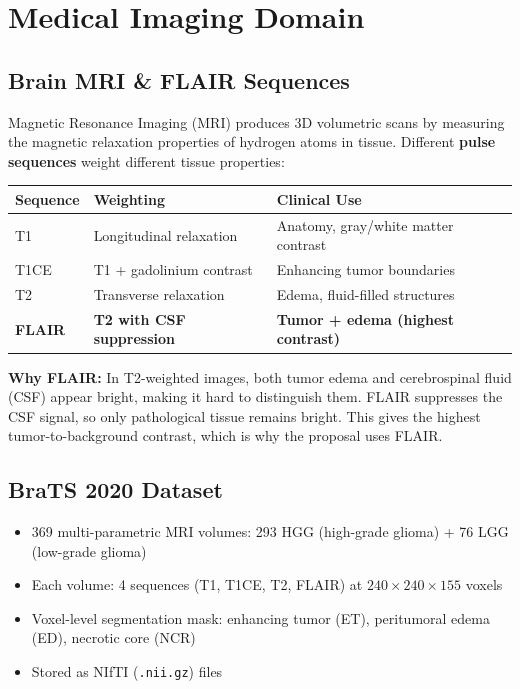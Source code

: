 \documentclass[11pt,a4paper]{article}
\theoremstyle{definition}
\begin{document}
\section{Medical Imaging Domain}

\subsection{Brain MRI \& FLAIR Sequences}

Magnetic Resonance Imaging (MRI) produces 3D volumetric scans by measuring the magnetic relaxation properties of hydrogen atoms in tissue. Different \textbf{pulse sequences} weight different tissue properties:

\begin{center}
\begin{tabular}{lll}
\toprule
Sequence & Weighting & Clinical Use \\
\midrule
T1 & Longitudinal relaxation & Anatomy, gray/white matter contrast \\
T1CE & T1 + gadolinium contrast & Enhancing tumor boundaries \\
T2 & Transverse relaxation & Edema, fluid-filled structures \\
\textbf{FLAIR} & \textbf{T2 with CSF suppression} & \textbf{Tumor + edema (highest contrast)} \\
\bottomrule
\end{tabular}
\end{center}

\textbf{Why FLAIR:} In T2-weighted images, both tumor edema and cerebrospinal fluid (CSF) appear bright, making it hard to distinguish them. FLAIR suppresses the CSF signal, so only pathological tissue remains bright. This gives the highest tumor-to-background contrast, which is why the proposal uses FLAIR.

\subsection{BraTS 2020 Dataset}

\begin{itemize}
    \item 369 multi-parametric MRI volumes: 293 HGG (high-grade glioma) + 76 LGG (low-grade glioma)
    \item Each volume: 4 sequences (T1, T1CE, T2, FLAIR) at $240 \times 240 \times 155$ voxels
    \item Voxel-level segmentation mask: enhancing tumor (ET), peritumoral edema (ED), necrotic core (NCR)
    \item Stored as NIfTI (\texttt{.nii.gz}) files
\end{itemize}
\end{document}
